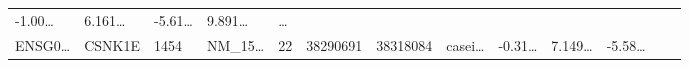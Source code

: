 \documentclass[
]{article}
\begin{document}
\begin{longtable}[]{@{}lllllllllllll@{}}
\begin{minipage}[t]{0.05\columnwidth}
-1.00\ldots{}\strut
\end{minipage} & \begin{minipage}[t]{0.05\columnwidth}\raggedright
6.161\ldots{}\strut
\end{minipage} & \begin{minipage}[t]{0.05\columnwidth}\raggedright
-5.61\ldots{}\strut
\end{minipage} & \begin{minipage}[t]{0.05\columnwidth}\raggedright
9.891\ldots{}\strut
\end{minipage} & \begin{minipage}[t]{0.02\columnwidth}\raggedright
\ldots{}\strut
\end{minipage}\tabularnewline
\begin{minipage}[t]{0.05\columnwidth}\raggedright
ENSG0\ldots{}\strut
\end{minipage} & \begin{minipage}[t]{0.05\columnwidth}\raggedright
CSNK1E\strut
\end{minipage} & \begin{minipage}[t]{0.05\columnwidth}\raggedright
1454\strut
\end{minipage} & \begin{minipage}[t]{0.05\columnwidth}\raggedright
NM\_15\ldots{}\strut
\end{minipage} & \begin{minipage}[t]{0.05\columnwidth}\raggedright
22\strut
\end{minipage} & \begin{minipage}[t]{0.05\columnwidth}\raggedright
38290691\strut
\end{minipage} & \begin{minipage}[t]{0.05\columnwidth}\raggedright
38318084\strut
\end{minipage} & \begin{minipage}[t]{0.05\columnwidth}\raggedright
casei\ldots{}\strut
\end{minipage} & \begin{minipage}[t]{0.05\columnwidth}\raggedright
-0.31\ldots{}\strut
\end{minipage} & \begin{minipage}[t]{0.05\columnwidth}\raggedright
7.149\ldots{}\strut
\end{minipage} & \begin{minipage}[t]{0.05\columnwidth}\raggedright
-5.58\ldots{}\strut
\end{minipage} & \begin{minipage}[t]{0.05\columnwidth}\raggedright

\end{minipage}
\end{longtable}
\end{document}
